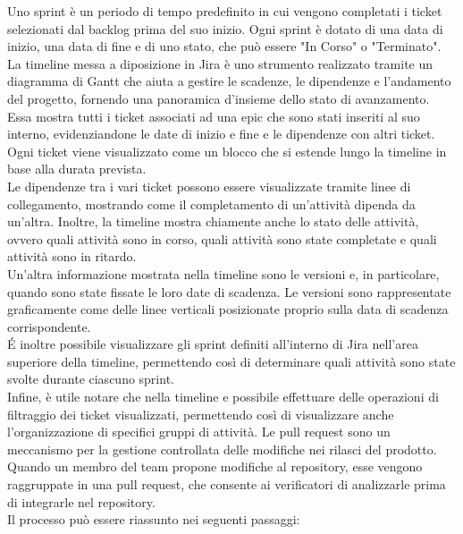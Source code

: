 Uno sprint è un periodo di tempo predefinito in cui vengono completati i ticket selezionati dal backlog prima del suo inizio. Ogni sprint è dotato di una data di inizio, una data di fine e di uno stato, che può essere "In Corso" o "Terminato".
La timeline messa a diposizione in Jira è uno strumento realizzato tramite un diagramma di Gantt che aiuta a gestire le scadenze, le dipendenze e l'andamento del progetto, fornendo una panoramica d'insieme dello stato di avanzamento.\\
Essa mostra tutti i ticket associati ad una epic che sono stati inseriti al suo interno, evidenziandone le date di inizio e fine e le dipendenze con altri ticket. Ogni ticket viene visualizzato come un blocco che si estende lungo la timeline in base alla durata prevista.\\
Le dipendenze tra i vari ticket possono essere visualizzate tramite linee di collegamento, mostrando come il completamento di un'attività dipenda da un’altra. Inoltre, la timeline mostra chiamente anche lo stato delle attività, ovvero quali attività sono in corso, quali attività sono state completate e quali attività sono in ritardo.\\
Un'altra informazione mostrata nella timeline sono le versioni e, in particolare, quando sono state fissate le loro date di scadenza. Le versioni sono rappresentate graficamente come delle linee verticali posizionate proprio sulla data di scadenza corrispondente.\\
\'E inoltre possibile visualizzare gli sprint definiti all'interno di Jira nell'area superiore della timeline, permettendo così di determinare quali attività sono state svolte durante ciascuno sprint.\\
Infine, è utile notare che nella timeline e possibile effettuare delle operazioni di filtraggio dei ticket visualizzati, permettendo così di visualizzare anche l'organizzazione di specifici gruppi di attività.
Le pull request sono un meccanismo per la gestione controllata delle modifiche nei rilasci del prodotto. Quando un membro del team propone modifiche al repository, esse vengono raggruppate in una pull request, che consente ai verificatori di analizzarle prima di integrarle nel repository.\\
Il processo può essere riassunto nei seguenti passaggi:
